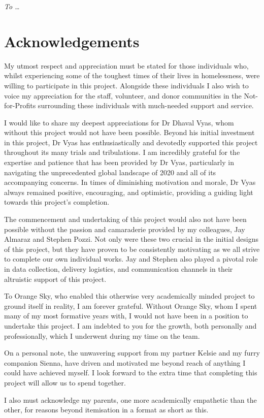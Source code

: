 \vspace*{70mm}
\begin{center}
    \renewcommand{\baselinestretch}{1.0}
    \sl
    To \ldots
\end{center}

\chapter{Acknowledgements}

My utmost respect and appreciation must be stated for those individuals who, whilst experiencing some of the toughest times of their lives in homelessness, were willing to participate in this project. Alongside these individuals I also wish to voice my appreciation for the staff, volunteer, and donor communities in the Not-for-Profits surrounding these individuals with much-needed support and service.

I would like to share my deepest appreciations for Dr Dhaval Vyas, whom without this project would not have been possible. Beyond his initial investment in this project, Dr Vyas has enthusiastically and devotedly supported this project throughout its many trials and tribulations. I am incredibly grateful for the expertise and patience that has been provided by Dr Vyas, particularly in navigating the unprecedented global landscape of 2020 and all of its accompanying concerns. In times of diminishing motivation and morale, Dr Vyas always remained positive, encouraging, and optimistic, providing a guiding light towards this project's completion.

The commencement and undertaking of this project would also not have been possible without the passion and camaraderie provided by my colleagues, Jay Almaraz and Stephen Pozzi. Not only were these two crucial in the initial designs of this project, but they have proven to be consistently motivating as we all strive to complete our own individual works. Jay and Stephen also played a pivotal role in data collection, delivery logistics, and communication channels in their altruistic support of this project.

To Orange Sky, who enabled this otherwise very academically minded project to ground itself in reality, I am forever grateful. Without Orange Sky, whom I spent many of my most formative years with, I would not have been in a position to undertake this project. I am indebted to you for the growth, both personally and professionally, which I underwent during my time on the team.

On a personal note, the unwavering support from my partner Kelsie and my furry companion Sienna, have driven and motivated me beyond reach of anything I could have achieved myself. I look forward to the extra time that completing this project will allow us to spend together.

I also must acknowledge my parents, one more academically empathetic than the other, for reasons beyond itemisation in a format as short as this. 

\cleardoublepage